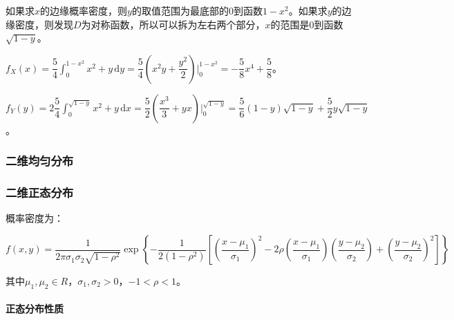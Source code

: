 \documentclass[UTF8, 12pt]{ctexart}
\begin{document}
\begin{minipage}{0.5\linewidth}
    
    如果求$x$的边缘概率密度，则$y$的取值范围为最底部的0到函数$1-x^2$。如果求$y$的边缘密度，则发现$D$为对称函数，所以可以拆为左右两个部分，$x$的范围是$0$到函数$\sqrt{1-y}$。

\end{minipage}
\hfill
\begin{minipage}{0.4\linewidth}
\end{minipage}

$f_X(x)=\dfrac{5}{4}\int_0^{1-x^2}x^2+y\,\textrm{d}y=\dfrac{5}{4}\left(x^2y+\dfrac{y^2}{2}\right)\bigg\vert_0^{1-x^2}=-\dfrac{5}{8}x^4+\dfrac{5}{8}$。

$f_Y(y)=2\dfrac{5}{4}\int_0^{\sqrt{1-y}}x^2+y\,\textrm{d}x=\dfrac{5}{2}\left(\dfrac{x^3}{3}+yx\right)\bigg\vert_0^{\sqrt{1-y}}=\dfrac{5}{6}(1-y)\sqrt{1-y}+\dfrac{5}{2}y\sqrt{1-y}$。

\subsubsection{二维均匀分布}

\subsubsection{二维正态分布}

概率密度为：

{\fontsize{8.2pt}{10pt}$f(x,y)=\dfrac{1}{2\pi\sigma_1\sigma_2\sqrt{1-\rho^2}}\exp\left\{-\dfrac{1}{2(1-\rho^2)}\left[\left(\dfrac{x-\mu_1}{\sigma_1}\right)^2-2\rho\left(\dfrac{x-\mu_1}{\sigma_1}\right)\left(\dfrac{y-\mu_2}{\sigma_2}\right)+\left(\dfrac{y-\mu_2}{\sigma_2}\right)^2\right]\right\}$}

其中$\mu_1,\mu_2\in R$，$\sigma_1,\sigma_2>0$，$-1<\rho<1$。

\paragraph{正态分布性质} \leavevmode \medskip
\end{document}
